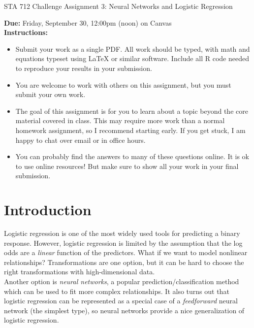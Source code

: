 \documentclass[11pt]{article}
\begin{document}
\begin{center}
\Large
STA 712 Challenge Assignment 3: Neural Networks and Logistic Regression\\
\normalsize
\vspace{5mm}
\end{center}

\noindent \textbf{Due:} Friday, September 30, 12:00pm (noon) on Canvas\\ 

\noindent \textbf{Instructions:} 
\begin{itemize}
\item Submit your work as a single PDF. All work should be typed, with math and equations typeset using LaTeX or similar software. Include all R code needed to reproduce your results in your submission.
\item You are welcome to work with others on this assignment, but you must submit your own work.
\item The goal of this assignment is for you to learn about a topic beyond the core material covered in class. This may require more work than a normal homework assignment, so I recommend starting early. If you get stuck, I am happy to chat over email or in office hours.
\item You can probably find the answers to many of these questions online. It is ok to use online resources! But make sure to show all your work in your final submission.
\end{itemize}

\section*{Introduction}

Logistic regression is one of the most widely used tools for predicting a binary response. However, logistic regression is limited by the assumption that the log odds are a \textit{linear} function of the predictors. What if we want to model nonlinear relationships? Transformations are one option, but it can be hard to choose the right transformations with high-dimensional data.\\

Another option is \textit{neural networks}, a popular prediction/classification method which can be used to fit more complex relationships. It also turns out that logistic regression can be represented as a special case of a \textit{feedforward} neural network (the simplest type), so neural networks provide a nice generalization of logistic regression.\\
\end{document}
